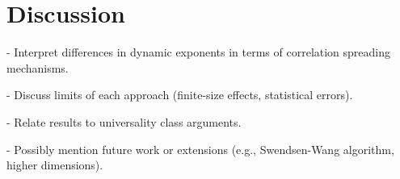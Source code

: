 \section{Discussion}

- Interpret differences in dynamic exponents in terms of correlation spreading mechanisms.

- Discuss limits of each approach (finite-size effects, statistical errors).

- Relate results to universality class arguments.

- Possibly mention future work or extensions (e.g., Swendsen-Wang algorithm, higher dimensions).

